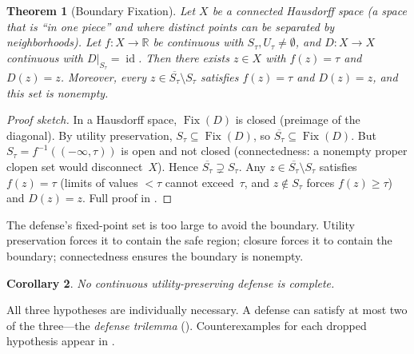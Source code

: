 \documentclass[11pt]{article}
\newtheorem{theorem}{Theorem}[section]
\newtheorem{corollary}[theorem]{Corollary}
\newcommand{\R}{\mathbb{R}}
\newcommand{\cl}[1]{\overline{#1}}
\newcommand{\Fix}{\operatorname{Fix}}
\newcommand{\id}{\operatorname{id}}
\begin{document}
\begin{theorem}[Boundary Fixation]
\label{thm:main}
Let $X$ be a connected Hausdorff space (a space that is ``in one
piece'' and where distinct points can be separated by neighborhoods).
Let $f\colon X\to\R$ be continuous with $S_\tau, U_\tau \neq
\emptyset$, and $D\colon X \to X$ continuous with
$D|_{S_\tau} = \id$. Then there exists $z\in X$ with $f(z) = \tau$
and $D(z) = z$. Moreover, every $z \in \cl{S_\tau} \setminus S_\tau$
satisfies $f(z) = \tau$ and $D(z) = z$, and this set is nonempty.
\end{theorem}

\begin{proof}[Proof sketch]
In a Hausdorff space, $\Fix(D)$ is closed (preimage of the diagonal).
By utility preservation, $S_\tau \subseteq \Fix(D)$, so
$\cl{S_\tau} \subseteq \Fix(D)$. But $S_\tau = f^{-1}((-\infty,\tau))$
is open and not closed (connectedness: a nonempty proper clopen set
would disconnect~$X$). Hence $\cl{S_\tau} \supsetneq S_\tau$. Any
$z \in \cl{S_\tau}\setminus S_\tau$ satisfies $f(z) = \tau$ (limits of
values ${<}\tau$ cannot exceed~$\tau$, and $z \notin S_\tau$ forces
$f(z) \geq \tau$) and $D(z) = z$. Full proof in .
\end{proof}

The defense's fixed-point set is too large to avoid the
boundary. Utility preservation forces it to contain the safe region;
closure forces it to contain the boundary; connectedness ensures the
boundary is nonempty.

\begin{corollary}
No continuous utility-preserving defense is complete.
\end{corollary}

All three hypotheses are individually necessary. A defense can satisfy
at most two of the three---the \emph{defense trilemma}
(). Counterexamples for each dropped hypothesis
appear in .
\end{document}
